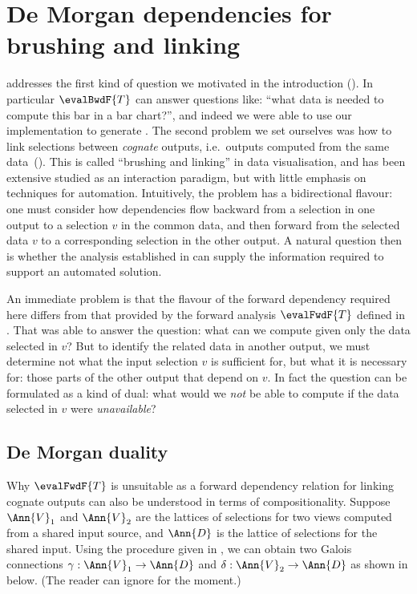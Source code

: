 \section{De Morgan dependencies for brushing and linking}
\label{sec:de-morgan}

 addresses the first kind of question we motivated in the introduction (). In particular $\evalBwdF{T}$ can answer questions like: ``what data is needed to compute this bar in a bar chart?'', and indeed we were able to use our implementation to generate . The second problem we set ourselves was how to link selections between \emph{cognate} outputs, i.e.~outputs computed from the same data~(). This is called ``brushing and linking'' \cite{becker87} in data visualisation, and has been extensive studied as an interaction paradigm, but with little emphasis on techniques for automation. Intuitively, the problem has a bidirectional flavour: one must consider how dependencies flow backward from a selection in one output to a selection $v$ in the common data, and then forward from the selected data $v$ to a corresponding selection in the other output. A natural question then is whether the analysis established in  can supply the information required to support an automated solution.

An immediate problem is that the flavour of the forward dependency required here differs from that provided by the forward analysis $\evalFwdF{T}$ defined in . That was able to answer the question: what can we compute given only the data selected in $v$? But to identify the related data in another output, we must determine not what the input selection $v$ is sufficient for, but what it is necessary for: those parts of the other output that depend on $v$. In fact the question can be formulated as a kind of dual: what would we \emph{not} be able to compute if the data selected in $v$ were \emph{unavailable}?

\subsection{De Morgan duality}
\label{sec:de-morgan:de-morgan-duality}

Why $\evalFwdF{T}$ is unsuitable as a forward dependency relation for linking cognate outputs can also be understood in terms of compositionality. Suppose $\Ann{V}_1$ and $\Ann{V}_2$ are the lattices of selections for two views computed from a shared input source, and $\Ann{D}$ is the lattice of selections for the shared input. Using the procedure given in , we can obtain two Galois connections $\gamma: \Ann{V}_1 \to \Ann{D}$ and $\delta: \Ann{V}_2 \to \Ann{D}$ as shown in  below. (The reader can ignore  for the moment.)

